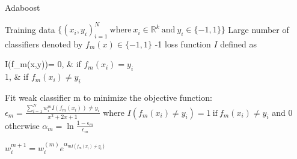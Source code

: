 \documentclass[a4paper]{article}
\begin{document}
  \begin{algorithm}
   \caption{Adaboost  ~ \cite{adaboostfirst}}
    \begin{algorithmic}[1]
    \INPUT 
    \Statex Training data $\{(x_i,y_i)_{i=1}^N \ \text{where}\ x_i \in  \mathbb{R}^k \ \text{and} \  y_i \in \{-1,1\} \}$
    \Statex Large number of classifiers denoted by $f_m(x) \in \{-1,1\} $
    -1 loss function $I$ defined as 
 \begin{numcases}{ I(f_m(x,y))=}
  0, & if $ f_m(x_i) = y_i $\\
  1, &  if $ f_m(x_i) \neq y_i $
\end{numcases}
     
            \State Fit weak classifier m to minimize the objective function:
            \State $\epsilon_m =  \frac{\sum_{i=1}^N w_{i}^m I(f_m(x_i)) \neq y_i}{x^2+2x+1} $
            \State where  $I(f_m(x_i) \neq y_i) =1 \  \text{if} \ f_m(x_i) \neq y_i  $ and 0 otherwise
            \State $\alpha_m = \ln \frac{1- \epsilon_m}{\epsilon_m}$
            
        \EndFor
              \State $w_{i}^ {m+1} = w_{i} ^{(m)} e^{\alpha_{mI(f_m(x_i) \neq y_i)}} $ 
         \EndFor 
         
        
        \EndFor
        
        


\end{algorithmic}
\end{algorithm}
\end{document}
